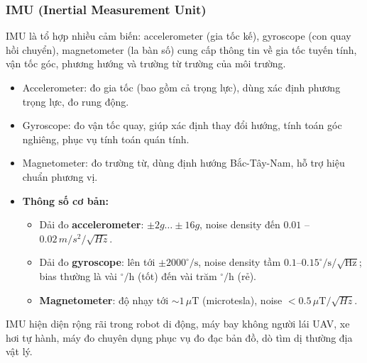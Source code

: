 \subsubsection{IMU (Inertial Measurement Unit)}
IMU là tổ hợp nhiều cảm biến: accelerometer (gia tốc kế), gyroscope (con quay hồi chuyển), magnetometer (la bàn số) cung cấp thông tin về gia tốc tuyến tính, vận tốc góc, phương hướng và trường từ trường của môi trường.
\begin{itemize}
    \item Accelerometer: đo gia tốc (bao gồm cả trọng lực), dùng xác định phương trọng lực, đo rung động.
    \item Gyroscope: đo vận tốc quay, giúp xác định thay đổi hướng, tính toán góc nghiêng, phục vụ tính toán quán tính.
    \item Magnetometer: đo trường từ, dùng định hướng Bắc-Tây-Nam, hỗ trợ hiệu chuẩn phương vị.
    \item \textbf{Thông số cơ bản:}
    \begin{itemize}
      \item Dải đo \textbf{accelerometer}: $\pm 2g \ldots \pm 16g$, 
            noise density đến $0.01$ -- $0.02 \,m/s^2/\sqrt{Hz}$.
            
      \item Dải đo \textbf{gyroscope}: lên tới $\pm 2000^{\circ}/\text{s}$, noise density tầm $0.1$--$0.15^{\circ}/\text{s}/\sqrt{\text{Hz}}$; 
            bias thường là vài $^{\circ}/\text{h}$ (tốt) đến vài trăm $^{\circ}/\text{h}$ (rẻ).
            
      \item \textbf{Magnetometer}: độ nhạy tới $\sim 1\,\mu\text{T}$ (microtesla), 
            noise $< 0.5\,\mu\text{T}/\sqrt{Hz}$.
    \end{itemize}
\end{itemize}
IMU hiện diện rộng rãi trong robot di động, máy bay không người lái UAV, xe hơi tự hành, máy đo chuyên dụng phục vụ đo đạc bản đồ, dò tìm dị thường địa vật lý.

